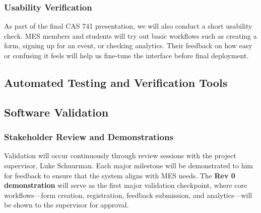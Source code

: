 \documentclass[12pt, titlepage]{article}
\begin{document}
\subsubsection*{Usability Verification}
As part of the final CAS 741 presentation, we will also conduct a short usability check. MES members and students will try out basic workflows such as creating a form, signing up for an event, or checking analytics. Their feedback on how easy or confusing it feels will help us fine-tune the interface before final deployment.

\subsection{Automated Testing and Verification Tools}




\subsection{Software Validation}

\subsubsection*{Stakeholder Review and Demonstrations}
Validation will occur continuously through review sessions with the project supervisor, Luke Schuurman. Each major milestone will be demonstrated to him for feedback to ensure that the system aligns with MES needs. The \textbf{Rev 0 demonstration} will serve as the first major validation checkpoint, where core workflows—form creation, registration, feedback submission, and analytics—will be shown to the supervisor for approval. 
\end{document}
